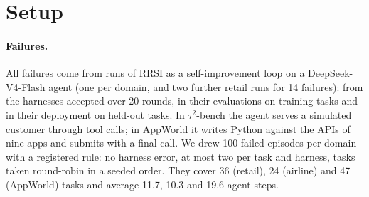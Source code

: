 \documentclass[11pt]{article}
\begin{document}
\section{Setup}
\label{sec:setup}

\paragraph{Failures.} All failures come from runs of RRSI \citep{rrsi2026} as a self-improvement loop on a DeepSeek-V4-Flash agent (one per domain, and two further retail runs for 14 failures): from the harnesses accepted over 20 rounds, in their evaluations on training tasks and in their deployment on held-out tasks. In $\tau^2$-bench \citep{barres2025tau2} the agent serves a simulated customer through tool calls; in AppWorld \citep{trivedi2024appworld} it writes Python against the APIs of nine apps and submits with a final call. We drew 100 failed episodes per domain with a registered rule: no harness error, at most two per task and harness, tasks taken round-robin in a seeded order. They cover 36 (retail), 24 (airline) and 47 (AppWorld) tasks and average 11.7, 10.3 and 19.6 agent steps.
\end{document}
